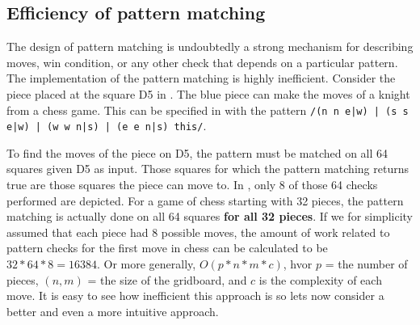 \subsection{Efficiency of pattern matching}
\label{sec:patternmatchingefficiency}
The design of pattern matching is undoubtedly a strong mechanism for describing moves, win condition, or any other check that depends on a particular pattern. The implementation of the pattern matching is highly inefficient. Consider the piece placed at the square D5 in . The blue piece can make the moves of a knight from a chess game. This can be specified in \productname{} with the pattern \texttt{/(n n e|w) | (s s e|w) | (w w n|s) | (e e n|s) this/}.


To find the moves of the piece on D5, the pattern must be matched on all 64 squares given D5 as input. Those squares for which the pattern matching returns true are those squares the piece can move to. In , only 8 of those 64 checks performed are depicted. For a game of chess starting with 32 pieces, the pattern matching is actually done on all 64 squares \textbf{for all 32 pieces}. If we for simplicity assumed that each piece had 8 possible moves, the amount of work related to pattern checks for the first move in chess can be calculated to be $32 * 64 * 8 = 16384$.
Or more generally, $O(p * n * m * c)$, hvor $p$ = the number of pieces, $(n, m)$ = the size of the gridboard, and $c$ is the complexity of each move. It is easy to see how inefficient this approach is so lets now consider a better and even a more intuitive approach.

